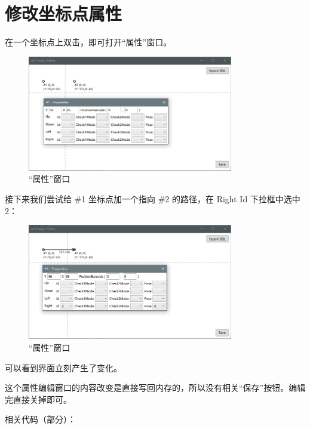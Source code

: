 \section{修改坐标点属性}

在一个坐标点上双击，即可打开``属性''窗口。

\begin{figure}[H]
  \centering
  \includegraphics[width=0.8\textwidth]{assets/prop.png}
  \caption{``属性''窗口}
  \label{fig:prop}
\end{figure}

接下来我们尝试给 \#1 坐标点加一个指向 \#2 的路径，在 Right Id 下拉框中选中 2：

\begin{figure}[H]
  \centering
  \includegraphics[width=0.8\textwidth]{assets/prop2.png}
  \caption{``属性''窗口}
  \label{fig:prop2}
\end{figure}

可以看到界面立刻产生了变化。

这个属性编辑窗口的内容改变是直接写回内存的，所以没有相关``保存''按钮。编辑完直接关掉即可。

相关代码（部分）：


